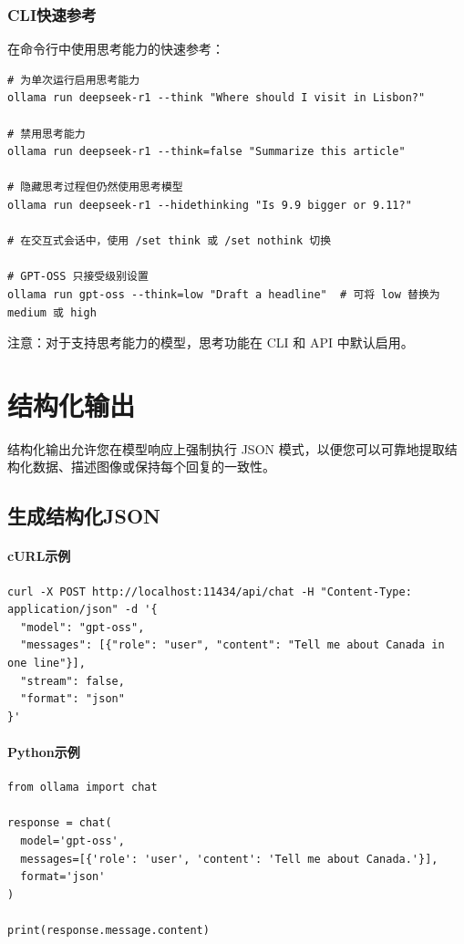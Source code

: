 \documentclass[12pt,UTF8]{ctexbook}
\begin{document}
\subsubsection{CLI快速参考}
在命令行中使用思考能力的快速参考：

\begin{verbatim}
# 为单次运行启用思考能力
ollama run deepseek-r1 --think "Where should I visit in Lisbon?"

# 禁用思考能力
ollama run deepseek-r1 --think=false "Summarize this article"

# 隐藏思考过程但仍然使用思考模型
ollama run deepseek-r1 --hidethinking "Is 9.9 bigger or 9.11?"

# 在交互式会话中，使用 /set think 或 /set nothink 切换

# GPT-OSS 只接受级别设置
ollama run gpt-oss --think=low "Draft a headline"  # 可将 low 替换为 medium 或 high
\end{verbatim}

注意：对于支持思考能力的模型，思考功能在 CLI 和 API 中默认启用。

\section{结构化输出}
结构化输出允许您在模型响应上强制执行 JSON 模式，以便您可以可靠地提取结构化数据、描述图像或保持每个回复的一致性。

\subsection{生成结构化JSON}

\paragraph{cURL示例}
\begin{verbatim}
curl -X POST http://localhost:11434/api/chat -H "Content-Type: application/json" -d '{
  "model": "gpt-oss",
  "messages": [{"role": "user", "content": "Tell me about Canada in one line"}],
  "stream": false,
  "format": "json"
}'
\end{verbatim}

\paragraph{Python示例}
\begin{verbatim}
from ollama import chat

response = chat(
  model='gpt-oss',
  messages=[{'role': 'user', 'content': 'Tell me about Canada.'}],
  format='json'
)

print(response.message.content)
\end{verbatim}
\end{document}
